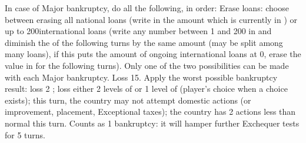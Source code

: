  In case of Major bankruptcy, do all the following,
in order:
\bparag Erase loans: choose between erasing all national loans (write in
 the amount which is currently in
) or up to 200\ducats international loans
(write any number between 1 and 200 in 
and diminish the  of the following
turns by the same amount (may be split among many loans), if this puts the
amount of ongoing international loans at 0\ducats, erase the value in
 for the following turns). Only one
of the two possibilities can be made with each Major bankruptcy.
\bparag Loss 15\VPs.
\bparag Apply the worst possible bankruptcy result: loss 2 \STAB; loss either
2 levels of \TradeFLEET or 1 level of \MNU (player's choice when a choice
exists); this turn, the country may not attempt domestic actions (\DTI or \FTI
improvement, \MNU placement, Exceptional taxes); the country has 2 \TFI
actions less than normal this turn.
\bparag Counts as 1 bankruptcy: it will hamper further Exchequer tests for 5
turns.

